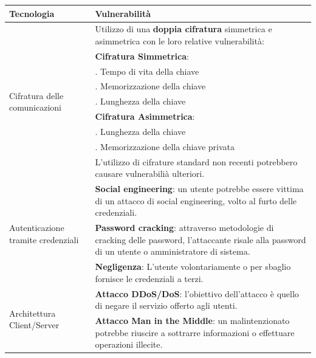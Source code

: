 \documentclass[a4paper]{article}
\begin{document}
\begin{center}
    \begin{tabularx}{1\textwidth}{|l|X|}
        \hline
        \textbf{Tecnologia} & \textbf{Vulnerabilità} \\
        \hline
        \hline
       \multirow{9}{*}{Cifratura delle comunicazioni} & Utilizzo di una \textbf{doppia cifratura} simmetrica e asimmetrica con le loro relative vulnerabilità:\\
                                      & \quad \textbf{Cifratura Simmetrica}:\\
                                      & \quad\quad 1. Tempo di vita della chiave\\
                                      & \quad\quad 2. Memorizzazione della chiave\\
                                      & \quad\quad 3. Lunghezza della chiave\\
                                      & \quad \textbf{Cifratura Asimmetrica}:\\
                                      & \quad\quad 1. Lunghezza della chiave\\
                                      & \quad\quad 2. Memorizzazione della chiave privata\\
                                      & L'utilizzo di cifrature standard non recenti potrebbero causare vulnerabilià ulteriori.\\
        \hline
        \multirow{3}{*}{Autenticazione tramite credenziali} & \textbf{Social engineering}: un utente potrebbe essere vittima di un attacco di social engineering, volto al furto delle credenziali. \\
                                           & \textbf{Password cracking}: attraverso metodologie di cracking delle password, l'attaccante risale alla password di un utente o amministratore di sistema. \\
                                           & \textbf{Negligenza}: L'utente volontariamente o per sbaglio fornisce le credenziali a terzi. \\
        \hline
        \multirow{5}{*}{Architettura Client/Server} & \textbf{Attacco DDoS/DoS}: l'obiettivo dell'attacco è quello di negare il servizio offerto agli utenti. \\
                                   & \textbf{Attacco Man in the Middle}: un malintenzionato potrebbe riuscire a sottrarre informazioni o effettuare operazioni illecite. \\

\end{tabularx}
\end{center}
\end{document}
